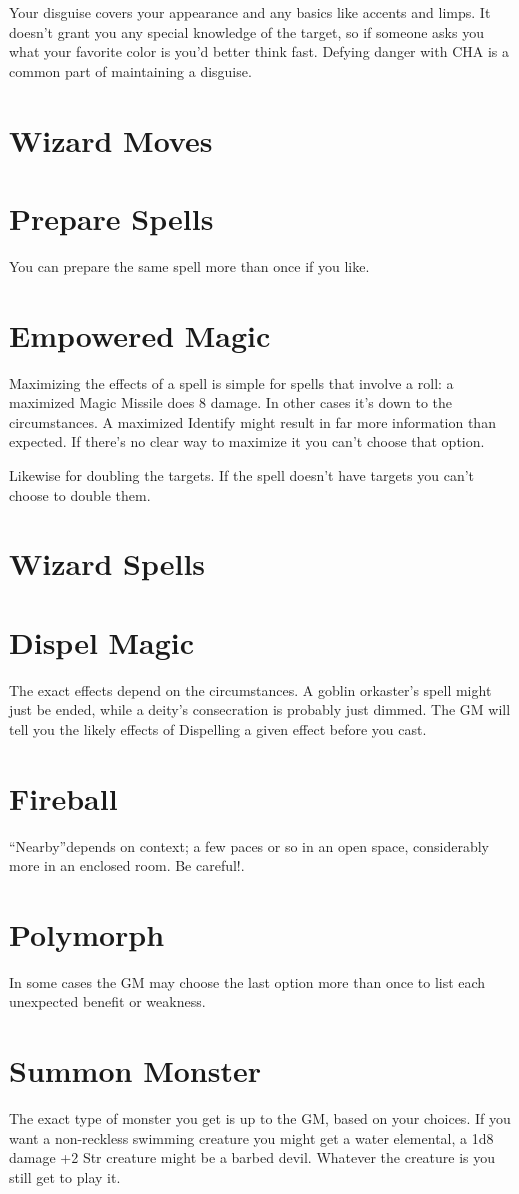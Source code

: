 Your disguise covers your appearance and any basics like accents and limps. It doesn't grant you any special knowledge of the target, so if someone asks you what your favorite color is you'd better think fast. Defying danger with CHA is a common part of maintaining a disguise.
\section{Wizard Moves}
\section{Prepare Spells}


 You can prepare the same spell more than once if you like.
\section{Empowered Magic}


 Maximizing the effects of a spell is simple for spells that involve a roll: a maximized Magic Missile does 8 damage. In other cases it's down to the circumstances. A maximized Identify might result in far more information than expected. If there's no clear way to maximize it you can't choose that option.


 Likewise for doubling the targets. If the spell doesn't have targets you can't choose to double them.
\section{Wizard Spells}
\section{Dispel Magic}


 The exact effects depend on the circumstances. A goblin orkaster's spell might just be ended, while a deity's consecration is probably just dimmed. The GM will tell you the likely effects of Dispelling a given effect before you cast.
\section{Fireball}


 ``Nearby''depends on context; a few paces or so in an open space, considerably more in an enclosed room. Be careful!.
\section{Polymorph}


 In some cases the GM may choose the last option more than once to list each unexpected benefit or weakness.
\section{Summon Monster}


 The exact type of monster you get is up to the GM, based on your choices. If you want a non-reckless swimming creature you might get a water elemental, a 1d8 damage +2 Str creature might be a barbed devil. Whatever the creature is you still get to play it.


